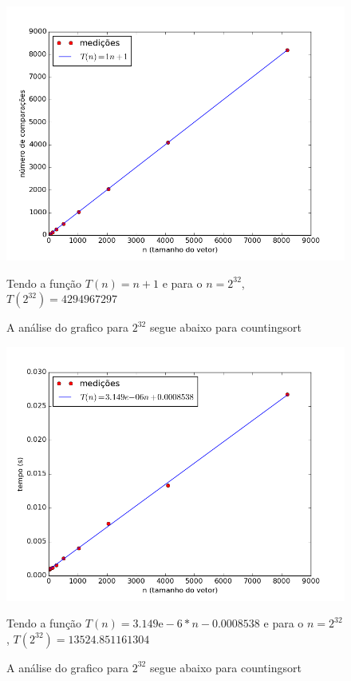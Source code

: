 \documentclass[12pt,a4paper,twoside]{report}
\begin{document}
\begin{figure}[ht]
\centering \includegraphics[scale=0.8]{../countingsort/imagens/countingsortQuaseCresc401.png}
\caption{A análise do grafico para $2^{32}$ segue abaixo para countingsort}

Tendo a função $T(n) = n+1$ e para o $n =2^{32}$, $T(2^{32}) = 4294967297$ 
\label{fig:countingsortQuaseCresc401}
\end{figure}




\begin{figure}[ht]
\centering \includegraphics[scale=0.8]{../countingsort/imagens/countingsortQuaseCresc500.png}
\caption{A análise do grafico para $2^{32}$ segue abaixo para countingsort}

Tendo a função $T(n) = 3.149\mathrm{e}-6*n-0.0008538$ e para o $n =2^{32}$, $T(2^{32}) = 13524.851161304$ 
\label{fig:countingsortQuaseCresc500}
\end{figure}
\end{document}

